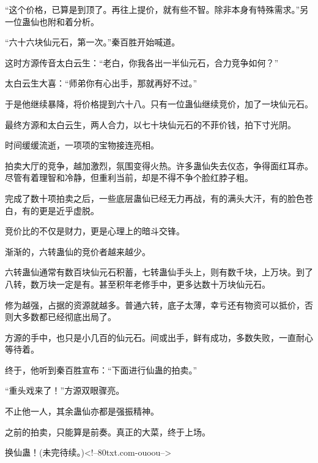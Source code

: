 \begin{this_body}
“这个价格，已算是到顶了。再往上提价，就有些不智。除非本身有特殊需求。”另一位蛊仙也附和着分析。

“六十六块仙元石，第一次。”秦百胜开始喊道。

这时方源传音太白云生：“老白，你我各出一半仙元石，合力竞争如何？”

太白云生大喜：“师弟你有心出手，那就再好不过。”

于是他继续暴降，将价格提到六十八。只有一位蛊仙继续竞价，加了一块仙元石。

最终方源和太白云生，两人合力，以七十块仙元石的不菲价钱，拍下寸光阴。

时间缓缓流逝，一项项的宝物接连亮相。

拍卖大厅的竞争，越加激烈，氛围变得火热。许多蛊仙失去仪态，争得面红耳赤。尽管有着理智和冷静，但重利当前，却是不得不争个脸红脖子粗。

完成了数十项拍卖之后，一些底层蛊仙已经无力再战，有的满头大汗，有的脸色苍白，有的更是近乎虚脱。

竞价比的不仅是财力，更是心理上的暗斗交锋。

渐渐的，六转蛊仙的竞价者越来越少。

六转蛊仙通常有数百块仙元石积蓄，七转蛊仙手头上，则有数千块，上万块。到了八转，数万块一定是有。甚至积年老修手中，更多达数十万块仙元石。

修为越强，占据的资源就越多。普通六转，底子太薄，幸亏还有物资可以抵价，否则大多数都已经彻底出局了。

方源的手中，也只是小几百的仙元石。间或出手，鲜有成功，多数失败，一直耐心等待着。

终于，他听到秦百胜宣布：“下面进行仙蛊的拍卖。”

“重头戏来了！”方源双眼骤亮。

不止他一人，其余蛊仙亦都是强振精神。

之前的拍卖，只能算是前奏。真正的大菜，终于上场。

换仙蛊！(未完待续。)<!--80txt.com-ouoou-->

\end{this_body}

